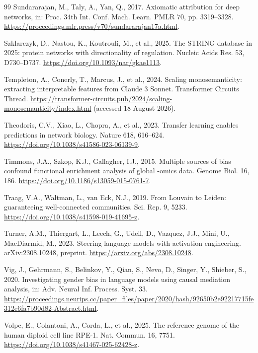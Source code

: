 \documentclass[review,authoryear,12pt]{elsarticle}
\begin{document}
\begin{thebibliography}{99}
 Sundararajan, M., Taly, A., Yan, Q., 2017. Axiomatic attribution for deep networks, in: Proc. 34th Int. Conf. Mach. Learn. PMLR 70, pp. 3319--3328. \url{https://proceedings.mlr.press/v70/sundararajan17a.html}.

 Szklarczyk, D., Nastou, K., Koutrouli, M., et al., 2025. The STRING database in 2025: protein networks with directionality of regulation. Nucleic Acids Res. 53, D730--D737. \url{https://doi.org/10.1093/nar/gkae1113}.

 Templeton, A., Conerly, T., Marcus, J., et al., 2024. Scaling monosemanticity: extracting interpretable features from Claude 3 Sonnet. Transformer Circuits Thread. \url{https://transformer-circuits.pub/2024/scaling-monosemanticity/index.html} (accessed 18 August 2026).

 Theodoris, C.V., Xiao, L., Chopra, A., et al., 2023. Transfer learning enables predictions in network biology. Nature 618, 616--624. \url{https://doi.org/10.1038/s41586-023-06139-9}.

 Timmons, J.A., Szkop, K.J., Gallagher, I.J., 2015. Multiple sources of bias confound functional enrichment analysis of global -omics data. Genome Biol. 16, 186. \url{https://doi.org/10.1186/s13059-015-0761-7}.

 Traag, V.A., Waltman, L., van Eck, N.J., 2019. From Louvain to Leiden: guaranteeing well-connected communities. Sci. Rep. 9, 5233. \url{https://doi.org/10.1038/s41598-019-41695-z}.

 Turner, A.M., Thiergart, L., Leech, G., Udell, D., Vazquez, J.J., Mini, U., MacDiarmid, M., 2023. Steering language models with activation engineering. arXiv:2308.10248, preprint. \url{https://arxiv.org/abs/2308.10248}.

 Vig, J., Gehrmann, S., Belinkov, Y., Qian, S., Nevo, D., Singer, Y., Shieber, S., 2020. Investigating gender bias in language models using causal mediation analysis, in: Adv. Neural Inf. Process. Syst. 33. \url{https://proceedings.neurips.cc/paper_files/paper/2020/hash/92650b2e92217715fe312e6fa7b90d82-Abstract.html}.

 Volpe, E., Colantoni, A., Corda, L., et al., 2025. The reference genome of the human diploid cell line RPE-1. Nat. Commun. 16, 7751. \url{https://doi.org/10.1038/s41467-025-62428-z}.


\end{thebibliography}
\end{document}
